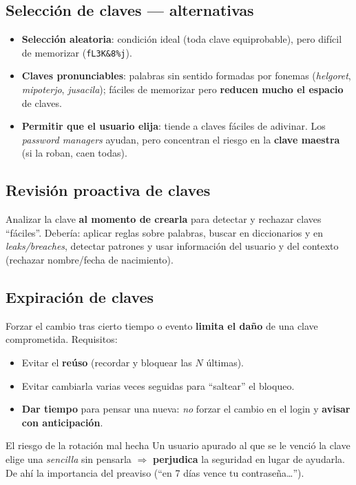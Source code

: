 \documentclass[11pt,a4paper]{article}
\begin{document}
\subsection{Selección de claves — alternativas}
\begin{itemize}[leftmargin=1.4em,itemsep=2pt]
  \item \textbf{Selección aleatoria}: condición ideal (toda clave equiprobable), pero
        difícil de memorizar (\texttt{fL3K\&8\%j}).
  \item \textbf{Claves pronunciables}: palabras sin sentido formadas por fonemas
        (\emph{helgoret}, \emph{mipoterjo}, \emph{jusacila}); fáciles de memorizar pero
        \textbf{reducen mucho el espacio} de claves.
  \item \textbf{Permitir que el usuario elija}: tiende a claves fáciles de adivinar.
        Los \emph{password managers} ayudan, pero concentran el riesgo en la
        \textbf{clave maestra} (si la roban, caen todas).
\end{itemize}

\subsection{Revisión proactiva de claves}
Analizar la clave \textbf{al momento de crearla} para detectar y rechazar claves ``fáciles''.
Debería: aplicar reglas sobre palabras, buscar en diccionarios y en \emph{leaks/breaches},
detectar patrones y usar información del usuario y del contexto (rechazar nombre/fecha de
nacimiento).

\subsection{Expiración de claves}
Forzar el cambio tras cierto tiempo o evento \textbf{limita el daño} de una clave
comprometida. Requisitos:
\begin{itemize}[leftmargin=1.4em,itemsep=1pt]
  \item Evitar el \textbf{reúso} (recordar y bloquear las $N$ últimas).
  \item Evitar cambiarla varias veces seguidas para ``saltear'' el bloqueo.
  \item \textbf{Dar tiempo} para pensar una nueva: \emph{no} forzar el cambio en el login y
        \textbf{avisar con anticipación}.
\end{itemize}
\begin{warnbox}{El riesgo de la rotación mal hecha}
Un usuario apurado al que se le venció la clave elige una \emph{sencilla} sin pensarla
$\Rightarrow$ \textbf{perjudica} la seguridad en lugar de ayudarla. De ahí la importancia del
preaviso (``en 7 días vence tu contraseña\dots'').
\end{warnbox}
\end{document}
